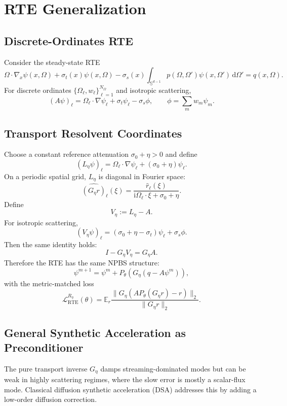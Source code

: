 \documentclass[11pt]{article}
\newcommand{\dd}{\mathrm{d}}
\newcommand{\ii}{\mathrm{i}}
\begin{document}
\section{RTE Generalization}

\subsection{Discrete-Ordinates RTE}

Consider the steady-state RTE
\[
  \Omega\cdot\nabla_x \psi(x,\Omega)
  + \sigma_t(x)\psi(x,\Omega)
  - \sigma_s(x)\int_{\mathbb{S}^{d-1}}p(\Omega,\Omega')\psi(x,\Omega')
    \,\dd \Omega'
  =
  q(x,\Omega).
\]
For discrete ordinates \(\{\Omega_\ell,w_\ell\}_{\ell=1}^{N_\Omega}\) and
isotropic scattering,
\[
  (A\psi)_\ell
  =
  \Omega_\ell\cdot\nabla \psi_\ell
  + \sigma_t \psi_\ell
  - \sigma_s \phi,
  \qquad
  \phi = \sum_m w_m\psi_m .
\]

\subsection{Transport Resolvent Coordinates}

Choose a constant reference attenuation \(\sigma_0+\eta>0\) and define
\[
  (L_{\eta}\psi)_\ell
  =
  \Omega_\ell\cdot\nabla \psi_\ell
  +(\sigma_0+\eta)\psi_\ell .
\]
On a periodic spatial grid, \(L_\eta\) is diagonal in Fourier space:
\[
  \widehat{(G_\eta r)}_\ell(\xi)
  =
  \frac{\hat r_\ell(\xi)}
  {\ii \Omega_\ell\cdot\xi + \sigma_0+\eta}.
\]
Define
\[
  V_\eta := L_\eta - A .
\]
For isotropic scattering,
\[
  (V_\eta\psi)_\ell
  =
  (\sigma_0+\eta-\sigma_t)\psi_\ell
  + \sigma_s \phi .
\]
Then the same identity holds:
\[
  I-G_\eta V_\eta = G_\eta A.
\]
Therefore the RTE has the same NPBS structure:
\[
  \psi^{m+1}
  =
  \psi^m + P_\theta\!\left(G_\eta(q-A\psi^m)\right),
\]
with the metric-matched loss
\[
  \mathcal{L}^{R_\eta}_{\mathrm{RTE}}(\theta)
  =
  \mathbb{E}_{r}
  \frac{
    \|G_\eta(A P_\theta(G_\eta r)-r)\|_2
  }{
    \|G_\eta r\|_2
  }.
\]

\subsection{General Synthetic Acceleration as Preconditioner}

The pure transport inverse \(G_\eta\) damps streaming-dominated modes but can be
weak in highly scattering regimes, where the slow error is mostly a scalar-flux
mode.  Classical diffusion synthetic acceleration (DSA) addresses this by
adding a low-order diffusion correction.
\end{document}
